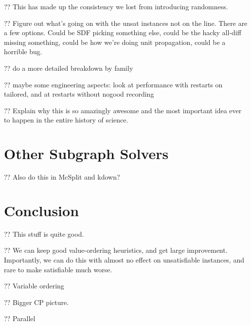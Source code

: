 \documentclass{article}
\begin{document}
?? This has made up the consistency we lost from introducing randomness.

?? Figure out what's going on with the unsat instances not on the line. There are a few options.
Could be SDF picking something else, could be the hacky all-diff missing something, could be how
we're doing unit propagation, could be a horrible bug.

?? do a more detailed breakdown by family

?? maybe some engineering aspects: look at performance with restarts on tailored, and at restarts
without nogood recording

?? Explain why this is so amazingly awesome and the most important idea ever to happen in the entire
history of science.

\section{Other Subgraph Solvers}

?? Also do this in McSplit and kdown?

\section{Conclusion}

?? This stuff is quite good.

?? We can keep good value-ordering heuristics, and get large improvement. Importantly, we can do
this with almost no effect on unsatisfiable instances, and rare to make satisfiable much worse.

?? Variable ordering

?? Bigger CP picture.

?? Parallel



\end{document}
